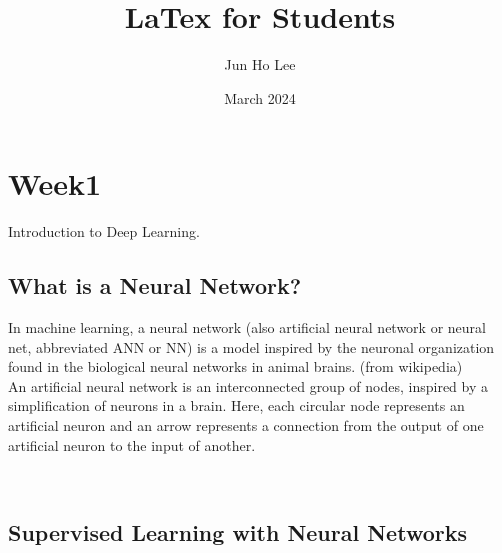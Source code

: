 \documentclass{article}
\title{LaTex for Students}
\author{Jun Ho Lee}
\date{March 2024}
\begin{document}
\newpage

\section{Week1}

    Introduction to Deep Learning.

\subsection{What is a Neural Network?}

In machine learning, a neural network (also artificial neural network or neural net, abbreviated ANN or NN) is a model inspired by the neuronal organization found in the biological neural networks in animal brains. (from wikipedia)\\

An artificial neural network is an interconnected group of nodes, inspired by a simplification of neurons in a brain. Here, each circular node represents an artificial neuron and an arrow represents a connection from the output of one artificial neuron to the input of another.\\

\\




\subsection{Supervised Learning with Neural Networks}
\end{document}
